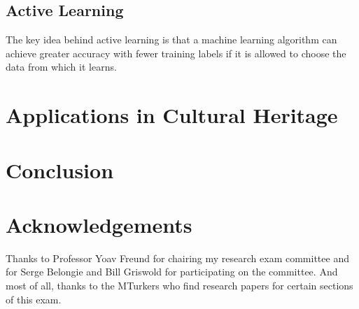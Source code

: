 \documentclass[10pt,twocolumn]{article}
\begin{document}
\subsection{Active Learning}

The key idea behind active learning is that a machine learning algorithm can
achieve greater accuracy with fewer training labels if it is allowed to choose the
data from which it learns.

\section{Applications in Cultural Heritage}
\label{sec:applications-heritage}

\section{Conclusion}
\section{Acknowledgements}
Thanks to Professor Yoav Freund for chairing my research exam committee and 
for Serge Belongie and Bill Griswold for participating on the committee.
And most of all, thanks to the MTurkers who find research papers for certain 
sections of this exam.



\end{document}

